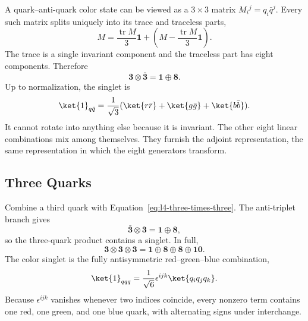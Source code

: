 A quark--anti-quark color state can be viewed as a \(3\times3\) matrix
\(M_i{}^j=q_i\bar q^j\). Every such matrix splits uniquely into its trace and
traceless parts,
\begin{equation}
M=\frac{\operatorname{tr}M}{3}\boldsymbol 1
+\left(M-\frac{\operatorname{tr}M}{3}\boldsymbol 1\right).
\end{equation}
The trace is a single invariant component and the traceless part has eight
components. Therefore
\begin{equation}
\boldsymbol 3\otimes\bar{\boldsymbol 3}
=\boldsymbol 1\oplus\boldsymbol 8.
\label{eq:l4-three-times-threebar}
\end{equation}
Up to normalization, the singlet is
\begin{equation}
\ket{1}_{q\bar q}
=\frac{1}{\sqrt3}
(\ket{r\bar r}+\ket{g\bar g}+\ket{b\bar b}).
\end{equation}
It cannot rotate into anything else because it is invariant. The other eight
linear combinations mix among themselves. They furnish the adjoint
representation, the same representation in which the eight generators
transform.

\subsection{Three Quarks}

Combine a third quark with Equation~\eqref{eq:l4-three-times-three}. The
anti-triplet branch gives
\begin{equation}
\bar{\boldsymbol 3}\otimes\boldsymbol 3
=\boldsymbol 1\oplus\boldsymbol 8,
\end{equation}
so the three-quark product contains a singlet. In full,
\begin{equation}
\boldsymbol 3\otimes\boldsymbol 3\otimes\boldsymbol 3
=\boldsymbol 1\oplus\boldsymbol 8\oplus\boldsymbol 8
\oplus\boldsymbol{10}.
\label{eq:l4-three-quark-full}
\end{equation}
The color singlet is the fully antisymmetric red--green--blue combination,
\begin{equation}
\ket{1}_{qqq}
=\frac{1}{\sqrt6}\epsilon^{ijk}\ket{q_iq_jq_k}.
\label{eq:l4-baryon-singlet}
\end{equation}
Because \(\epsilon^{ijk}\) vanishes whenever two indices coincide, every
nonzero term contains one red, one green, and one blue quark, with alternating
signs under interchange.

\begin{classroomqa}
\end{classroomqa}

